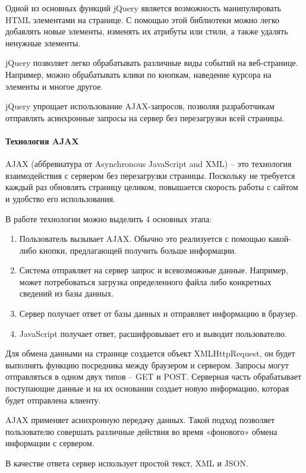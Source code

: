 Одной из основных функций jQuery является возможность манипулировать HTML элементами на странице. С помощью этой библиотеки можно легко добавлять новые элементы, изменять их атрибуты или стили, а также удалять ненужные элементы.

jQuery позволяет легко обрабатывать различные виды событий на веб-странице. Например, можно обрабатывать клики по кнопкам, наведение курсора на элементы и многое другое.

jQuery упрощает использование AJAX-запросов, позволяя разработчикам отправлять асинхронные запросы на сервер без перезагрузки всей страницы.

\paragraph{Технология AJAX}
AJAX (аббревиатура от Asynchronous JavaScript and XML) – это технология взаимодействия с сервером без перезагрузки страницы. Поскольку не требуется каждый раз обновлять страницу целиком, повышается скорость работы с сайтом и удобство его использования.

В работе технологии можно выделить 4 основных этапа:
\begin{enumerate}
	\item Пользователь вызывает AJAX. Обычно это реализуется с помощью какой-либо кнопки, предлагающей получить больше информации.
	\item Система отправляет на сервер запрос и всевозможные данные. Например, может потребоваться загрузка определенного файла либо конкретных сведений из базы данных.
	\item Сервер получает ответ от базы данных и отправляет информацию в браузер.
	\item JavaScript получает ответ, расшифровывает его и выводит пользователю.
\end{enumerate}

Для обмена данными на странице создается объект XMLHttpRequest, он будет выполнять функцию посредника между браузером и сервером. Запросы могут отправляться в одном двух типов – GET и POST. Серверная часть обрабатывает поступающие данные и на их основании создает новую информацию, которая будет отправлена клиенту.

AJAX применяет асинхронную передачу данных. Такой подход позволяет пользователю совершать различные действия во время «фонового» обмена информации с сервером.

В качестве ответа сервер использует простой текст, XML и JSON.

